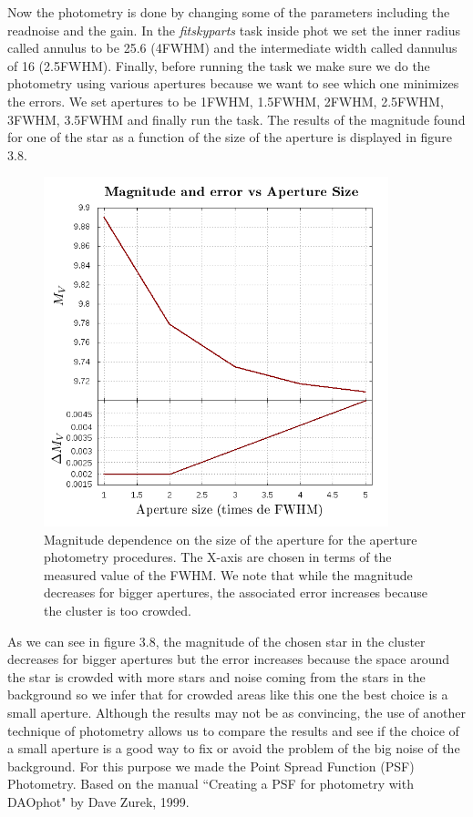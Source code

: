 Now the photometry is done by changing some of the parameters including the readnoise and the gain. In the \textit{fitskyparts} task inside phot we set the inner radius called annulus to be 25.6 (4FWHM) and the intermediate width called dannulus of 16 (2.5FWHM). Finally, before running the task we make sure we do the photometry using various apertures because we want to see which one minimizes the errors. We set apertures to be 1FWHM, 1.5FWHM, 2FWHM, 2.5FWHM, 3FWHM, 3.5FWHM and finally run the task. The results of the magnitude found for one of the star as a function of the size of the aperture is displayed in figure 3.8.

\begin{figure}[H]
\centering
\includegraphics[width=10cm]{images/aperture_size.png}
\caption[Photometry results of Magnitudes vs Size of apertures]{Magnitude dependence on the size of the aperture for the aperture photometry procedures. The X-axis are chosen in terms of the measured value of the FWHM. We note that while the magnitude decreases for bigger apertures, the associated error increases because the cluster is too crowded.}
\end{figure}

As we can see in figure 3.8, the magnitude of the chosen star in the cluster decreases for bigger apertures but the error increases because the space around the star is crowded with more stars and noise coming from the stars in the background so we infer that for crowded areas like this one the best choice is a small aperture. Although the results may not be as convincing, the use of another technique of photometry allows us to compare the results and see if the choice of a small aperture is a good way to fix or avoid the problem of the big noise of the background. For this purpose we made the Point Spread Function (PSF) Photometry. Based on the manual ``Creating a PSF for photometry with DAOphot" by Dave Zurek, 1999.

